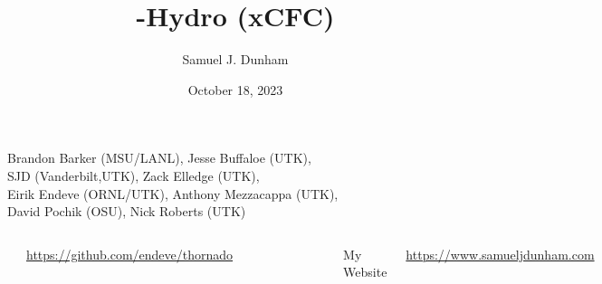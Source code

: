 \documentclass{beamer}
\title[VAST]{\thornado-Hydro (xCFC)}
\author{Samuel J. Dunham}
\date{October 18, 2023}
\begin{document}
\begin{frame}

  \maketitle

  \vspace{-1em}

  \begin{center}
    Brandon Barker (MSU/LANL), %
    Jesse Buffaloe (UTK), \\
    SJD (Vanderbilt,UTK), %
    Zack Elledge (UTK), \\
    Eirik Endeve (ORNL/UTK), %
    Anthony Mezzacappa (UTK), \\
    David Pochik (OSU), %
    Nick Roberts (UTK)
  \end{center}

  \vspace{-1em}

  \begin{columns}[c]

      \begin{center}\thornado\end{center}
      \vspace{-2.0em}
      \begin{center}{\tiny \url{https://github.com/endeve/thornado}}\end{center}
      \vspace{-1.5em}
      \begin{figure}[htb!]
       \centering
       \includegraphics[width=0.2\textwidth]{fig.thornado.png}
      \end{figure}

      \begin{center}My Website\end{center}
      \vspace{-2.0em}
      \begin{center}{\tiny \url{https://www.samueljdunham.com}}\end{center}
      \vspace{-1.5em}
      \begin{figure}[htb!]
       \centering
       \includegraphics[width=0.2\textwidth]{fig.website.png}
      \end{figure}

  \end{columns}

\end{frame}
\end{document}
